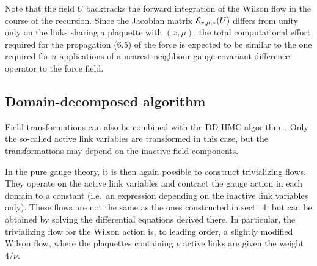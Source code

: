 \noindent
Note that the field $U$ backtracks
the forward integration of the Wilson flow
in the course of the recursion.
Since the Jacobian matrix $\mathcal{E}_{x,\mu,*}(U)$ differs from unity
only on the links sharing a plaquette with $(x,\mu)$,
the total computational effort required
for the propagation (6.5) of the force
is expected to be similar to the one required for
$n$ applications of a nearest-neighbour
gauge-covariant difference operator to the force field.


\subsection{Domain-decomposed algorithm}

Field transformations
can also be combined with the DD-HMC algorithm~\cite{DDHMC}.
Only the so-called active link variables
are transformed in this case, but the transformations may depend on
the inactive field components.

In the pure gauge theory, it is then again possible to
construct trivializing flows. They operate
on the active link variables and
contract the gauge action in each do\-main to a constant
(i.e.\ an expression depending on the inactive link variables
only).
These flows are not the same as the ones constructed
in sect.~4, but can be obtained by solving
the differential equations derived there.
In particular,
the trivializing flow
for the Wilson action is, to leading order,
a slightly modified Wilson flow,
where the plaquettes containing $\nu$ active links
are given the weight $4/\nu$.
